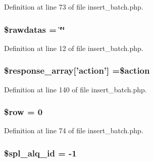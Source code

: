 Definition at line 73 of file insert\-\_\-batch.\-php.

\hypertarget{insert__batch_8php_abdab71b959b28075ae105e76f2bb59c4}{
\subsubsection[{\$rawdatas}]{\setlength{\rightskip}{0pt plus 5cm}\$rawdatas = \char`\"{}\char`\"{}}}\label{insert__batch_8php_abdab71b959b28075ae105e76f2bb59c4}


Definition at line 12 of file insert\-\_\-batch.\-php.

\hypertarget{insert__batch_8php_ae768978a0cdc416c0d63d798c85c8784}{
\subsubsection[{\$response\-\_\-array}]{\setlength{\rightskip}{0pt plus 5cm}\$response\-\_\-array\mbox{[}'action'\mbox{]} =\$action}}\label{insert__batch_8php_ae768978a0cdc416c0d63d798c85c8784}


Definition at line 140 of file insert\-\_\-batch.\-php.

\hypertarget{insert__batch_8php_aa1d731aa570613e5bcff831bb10e9b87}{
\subsubsection[{\$row}]{\setlength{\rightskip}{0pt plus 5cm}\$row = 0}}\label{insert__batch_8php_aa1d731aa570613e5bcff831bb10e9b87}


Definition at line 74 of file insert\-\_\-batch.\-php.

\hypertarget{insert__batch_8php_a21f886ec964303dbe9fd97ad31a0951b}{
\subsubsection[{\$spl\-\_\-alq\-\_\-id}]{\setlength{\rightskip}{0pt plus 5cm}\$spl\-\_\-alq\-\_\-id = -\/1}}\label{insert__batch_8php_a21f886ec964303dbe9fd97ad31a0951b}


